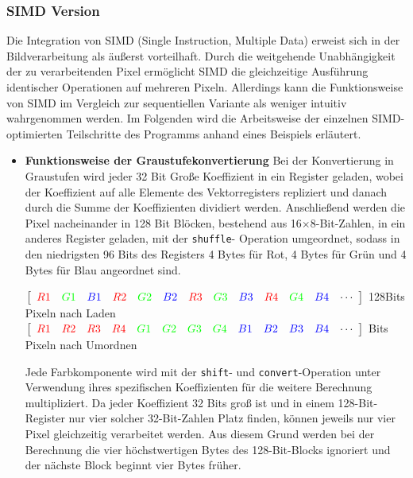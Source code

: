 \documentclass[course=erap]{aspdoc}
\begin{document}
\subsubsection{SIMD Version}
Die Integration von SIMD (Single Instruction, Multiple Data) erweist sich in der Bildverarbeitung als äußerst vorteilhaft. Durch die weitgehende Unabhängigkeit der zu verarbeitenden Pixel ermöglicht SIMD die gleichzeitige Ausführung identischer Operationen auf mehreren Pixeln. Allerdings kann die Funktionsweise von SIMD im Vergleich zur sequentiellen Variante als weniger intuitiv wahrgenommen werden. Im Folgenden wird die Arbeitsweise der einzelnen SIMD-optimierten Teilschritte des Programms anhand eines Beispiels erläutert.
\begin{itemize}
\item \textbf{Funktionsweise der Graustufekonvertierung}\newline 
Bei der Konvertierung in Graustufen wird jeder 32 Bit Große Koeffizient in ein Register geladen, wobei der Koeffizient auf alle Elemente des Vektorregisters repliziert und danach durch die Summe der Koeffizienten dividiert werden. Anschließend werden die Pixel nacheinander in 128 Bit Blöcken, bestehend aus 16$\times$8-Bit-Zahlen, in ein anderes Register geladen, mit der \texttt{shuffle}- Operation umgeordnet, sodass in den niedrigsten 96 Bits des Registers 4 Bytes für Rot, 4 Bytes für Grün und 4 Bytes für Blau angeordnet sind.
\begin{center}
$\left[\begin{array}{cccccccccccccc}
\textcolor{red}{R1} & \textcolor{green}{G1} & \textcolor{blue}{B1} & \textcolor{red}{R2} & \textcolor{green}{G2} & \textcolor{blue}{B2} & \textcolor{red}{R3} & \textcolor{green}{G3} & \textcolor{blue}{B3} & \textcolor{red}{R4} & \textcolor{green}{G4} & \textcolor{blue}{B4} & \cdots\end{array}\right]$
\newline128Bits Pixeln nach Laden
\hfill
\centering
$\left[\begin{array}{cccccccccccccc}
\textcolor{red}{R1} & \textcolor{red}{R2} & \textcolor{red}{R3} & \textcolor{red}{R4} & \textcolor{green}{G1} & \textcolor{green}{G2} & \textcolor{green}{G3} & \textcolor{green}{G4} & \textcolor{blue}{B1} & \textcolor{blue}{B2} & \textcolor{blue}{B3} & \textcolor{blue}{B4} & \cdots\end{array}\right]$
 Bits Pixeln nach Umordnen
\end{center}
Jede Farbkomponente wird mit der \texttt{shift}- und \texttt{convert}-Operation unter Verwendung ihres spezifischen Koeffizienten für die weitere Berechnung multipliziert. Da jeder Koeffizient 32 Bits groß ist und in einem 128-Bit-Register nur vier solcher 32-Bit-Zahlen Platz finden, können jeweils nur vier Pixel gleichzeitig verarbeitet werden. Aus diesem Grund werden bei der Berechnung die vier höchstwertigen Bytes des 128-Bit-Blocks ignoriert und der nächste Block beginnt vier Bytes früher.

\end{itemize}
\end{document}
